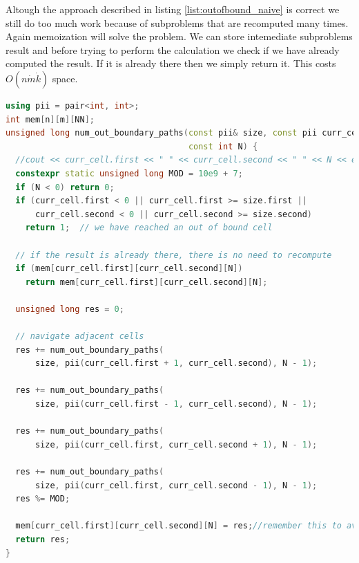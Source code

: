 Altough the approach described in listing \ref{list:outofbound_naive} is correct we still do too much work because of subproblems that are recomputed many times. Again memoization will solve the problem. We can store intemediate subproblems result and before trying to perform the calculation we check if we have already computed the result. If it is already there then we simply return it. This costs $O(n \dot m \dot k)$ space.

\begin{lstlisting}[language=c++, caption="Number of distincts paths to an out of bound cell algorithms",label=list:outofbound_naive]
using pii = pair<int, int>;
int mem[n][m][NN];
unsigned long num_out_boundary_paths(const pii& size, const pii curr_cell,
                                     const int N) {
  //cout << curr_cell.first << " " << curr_cell.second << " " << N << endl;
  constexpr static unsigned long MOD = 10e9 + 7;
  if (N < 0) return 0;
  if (curr_cell.first < 0 || curr_cell.first >= size.first ||
      curr_cell.second < 0 || curr_cell.second >= size.second)
    return 1;  // we have reached an out of bound cell

  // if the result is already there, there is no need to recompute
  if (mem[curr_cell.first][curr_cell.second][N])
    return mem[curr_cell.first][curr_cell.second][N];

  unsigned long res = 0;

  // navigate adjacent cells
  res += num_out_boundary_paths(
      size, pii(curr_cell.first + 1, curr_cell.second), N - 1);

  res += num_out_boundary_paths(
      size, pii(curr_cell.first - 1, curr_cell.second), N - 1);

  res += num_out_boundary_paths(
      size, pii(curr_cell.first, curr_cell.second + 1), N - 1);

  res += num_out_boundary_paths(
      size, pii(curr_cell.first, curr_cell.second - 1), N - 1);
  res %= MOD;

  mem[curr_cell.first][curr_cell.second][N] = res;//remember this to avoid recomputation
  return res;
}
\end{lstlisting}









